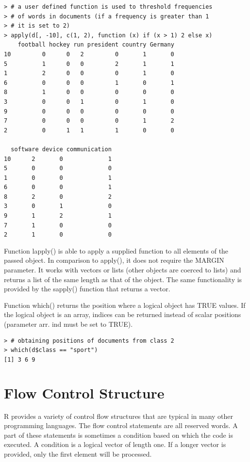 \documentclass[11pt,openany,executivepaper]{book}
\begin{document}
\begin{verbatim}
> # a user defined function is used to threshold frequencies
> # of words in documents (if a frequency is greater than 1
> # it is set to 2)
> apply(d[, -10], c(1, 2), function (x) if (x > 1) 2 else x)
    football hockey run president country Germany
10         0      0   2         0       1       0
5          1      0   0         2       1       1
1          2      0   0         0       1       0
6          0      0   0         1       0       1
8          1      0   0         0       0       0
3          0      0   1         0       1       0
9          0      0   0         0       0       0
7          0      0   0         0       1       2
2          0      1   1         1       0       0

  software device communication
10      2       0             1
5       0       0             0
1       0       0             1
6       0       0             1
8       2       0             2
3       0       1             0
9       1       2             1
7       1       0             0
2       1       0             0
\end{verbatim}

Function lapply() is able to apply a supplied function to all elements of the passed object. In comparison to apply(), it does not require the MARGIN parameter. It works with vectors or lists (other objects are coerced to lists) and returns a list of the same length as that of the object. The same functionality is provided by the sapply() function that returns a vector.

Function which() returns the position where a logical object has TRUE values. If the logical object is an array, indices can be returned instead of scalar positions (parameter arr. ind must be set to TRUE).

\begin{verbatim}
> # obtaining positions of documents from class 2
> which(d$class == "sport")
[1] 3 6 9
\end{verbatim}

\section{Flow Control Structure}
R provides a variety of control flow structures that are typical in many other programming languages. The flow control statements are all reserved words. A part of these statements is sometimes a condition based on which the code is executed. A condition is a logical vector of length one. If a longer vector is provided, only the first element will be processed.
\end{document}
